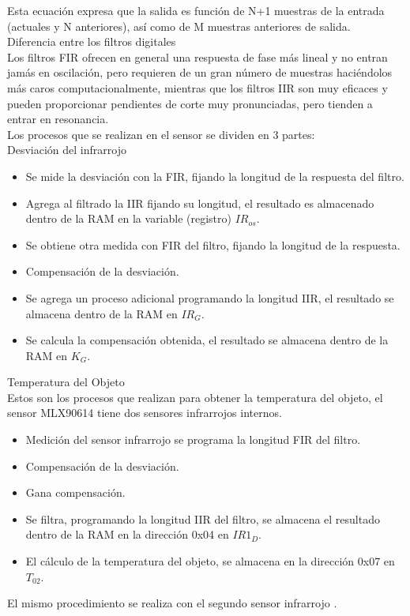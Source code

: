 Esta ecuación expresa que la salida es función de N+1 muestras de la entrada (actuales y N anteriores), así como de M muestras anteriores de salida. \\

Diferencia entre los filtros digitales \\

Los filtros FIR ofrecen en general una respuesta de fase más lineal y no entran jamás en oscilación, pero requieren de un gran número de muestras haciéndolos más caros computacionalmente, mientras que los filtros IIR son muy eficaces y pueden proporcionar pendientes de corte muy pronunciadas, pero tienden a entrar en resonancia\cite{cuarentayocho}. \\

Los procesos que se realizan en el sensor se dividen en 3 partes: \\

Desviación del infrarrojo \\

\begin{itemize}
	\item Se mide la desviación con la FIR, fijando la longitud de la respuesta del filtro.
	\item Agrega al filtrado la IIR fijando su longitud, el resultado es almacenado dentro de la RAM en la variable (registro) $IR_{os}$.
	\item Se obtiene otra medida con FIR del filtro, fijando la longitud de la respuesta.
	\item Compensación de la desviación.
	\item Se agrega un proceso adicional programando la longitud IIR, el resultado se almacena dentro de la RAM en $IR_G$.
	\item Se calcula la compensación obtenida, el resultado se almacena dentro de la RAM en $K_G$.
\end{itemize}

Temperatura del Objeto \\

Estos son los procesos que realizan para obtener la temperatura del objeto, el sensor MLX90614 tiene dos sensores infrarrojos internos. \\

\begin{itemize}
	\item Medición del sensor infrarrojo se programa la longitud FIR del filtro.
	\item Compensación de la desviación.
	\item Gana compensación.
	\item Se filtra, programando la longitud IIR del filtro, se almacena el resultado dentro de la RAM en la dirección 0x04 en $IR1_D$.
	\item El cálculo de la temperatura del objeto, se almacena en la dirección 0x07 en $T_{02}$.
	
\end{itemize}

El mismo procedimiento se realiza con el segundo sensor infrarrojo \cite{cuarentaycinco}.

